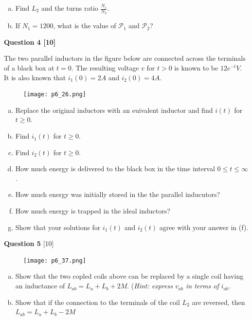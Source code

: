 \documentclass[12pt]{article}
\begin{document}
\begin{enumerate}[(a)]
\item Find $L_2$ and the turns ratio $\frac{N_1}{N_2}$.
\item If $N_1 = 1200$, what is the value of $\mathcal{P}_{1}$ and $\mathcal{P}_{2}$?
\end{enumerate} 

\newpage

{\bf Question 4 [10]} %

The two parallel inductors in the figure below are connected across the terminals of a black box at $t = 0$. The resulting voltage $v$ for $t>0$ is known to be $12 e^{-t} V$. It is also known that $i_1(0) = 2A$ and $i_2(0) = 4A$.

\begin{figure}[h!]
\begin{center}
 \texttt{[image: p6\_26.png]}
\end{center}
\end{figure}

\begin{enumerate}[(a)]
\item Replace the original inductors with an euivalent inductor and find $i(t)$ for $t \geq 0$.
\item Find $i_1(t)$ for $t \geq 0$.
\item Find $i_2(t)$ for $t \geq 0$.
\item How much energy is delivered to the black box in the time interval $0 \leq t \leq \infty$.
\item How much energy was initially stored in the the parallel inducutors?
\item How much energy is trapped in the ideal inductors?
\item Show that your solutions for $i_1(t)$ and $i_2(t)$ agree with your answer in (f).
\end{enumerate} 

{\bf Question 5} [10] %

\begin{figure}[h!]
\begin{center}
 \texttt{[image: p6\_37.png]}
\end{center}
\end{figure}

\begin{enumerate}[(a)]
\item Show that the two copled coils above can be replaced by a single coil having an inductance of $L_{ab} = L_a + L_b + 2M$. (\textit{Hint: express $v_{ab}$ in terms of $i_{ab}$.}
\item Show that if the connection to the terminals of the coil $L_2$ are reversed, then $L_{ab} = L_a + L_b - 2M$
\end{enumerate} 
\end{document}
